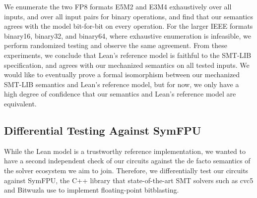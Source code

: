 We enumerate the two FP8 formats E5M2 and E3M4 exhaustively over all inputs, and
over all input pairs for binary operations, and find that our semantics agrees with the model bit-for-bit on every operation.
For the larger IEEE formats binary16, binary32, and binary64, where exhaustive
enumeration is infeasible, we perform randomized testing and observe the same agreement.
From these experiments, we conclude that Lean's reference model is faithful to the SMT-LIB specification,
and agrees with our mechanized semantics on all tested inputs.
We would like to eventually prove a formal isomorphism between our mechanized SMT-LIB semantics and Lean's reference model,
but for now, we only have a high degree of confidence that our semantics and Lean's reference model are equivalent.


\subsection{Differential Testing Against SymFPU}

While the Lean model is a trustworthy reference implementation,
we wanted to have a second independent check of our circuits against the de facto semantics of the solver ecosystem we aim to join.
Therefore, we differentially test our circuits against SymFPU,
the C++ library that state-of-the-art SMT solvers such as cvc5 and Bitwuzla use to implement floating-point bitblasting.


